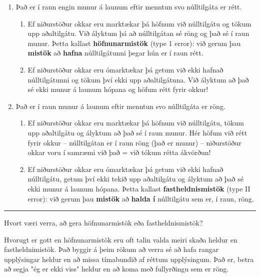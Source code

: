 \documentclass[
]{book}
\theoremstyle{definition}
\theoremstyle{definition}
\theoremstyle{definition}
\theoremstyle{definition}
\theoremstyle{remark}
\begin{document}
\begin{enumerate}
\def\labelenumi{\arabic{enumi}.}
\item
  Það er í raun engin munur á launum eftir menntun svo núlltilgáta er rétt.

  \begin{enumerate}
  \def\labelenumii{\arabic{enumii}.}
  \item
    Ef niðurstöður okkar eru marktækar þá höfnum við núlltilgátu og tökum upp aðaltilgátu. Við ályktum þá að núlltilgátan sé röng og það sé í raun munur. Þetta kallast \textbf{höfnunarmistök} (type 1 error): við gerum þau \textbf{mistök} að \textbf{hafna} núlltilgátunni þegar hún er í raun rétt.
  \item
    Ef niðurstöður okkar eru ómarktækar þá getum við ekki hafnað núlltilgátunni og tökum því ekki upp aðaltilgátuna. Við ályktum að það sé ekki munur á launum hópana og höfum rétt fyrir okkur!
  \end{enumerate}
\item
  Það er í raun munur á launum eftir menntun svo núlltilgáta er röng.

  \begin{enumerate}
  \def\labelenumii{\arabic{enumii}.}
  \item
    Ef niðurstöður okkar eru marktækar þá höfnum við núlltilgátu, tökum upp aðaltilgátu og ályktum að það sé í raun munur. Hér höfum við rétt fyrir okkur -- núlltilgátan er í raun röng (það er munur) -- niðurstöður okkar voru í samræmi við það = við tókum rétta ákvörðun!
  \item
    Ef niðurstöður okkar eru ómarktækar þá getum við ekki hafnað núlltilgátu, getum því ekki tekið upp aðaltilgátu og ályktum að það sé ekki munur á launum hópana. Þetta kallast \textbf{fastheldnismistök} (type II error): við gerum þau \textbf{mistök} að \textbf{halda í} núlltilgátu sem er, í
    raun, röng.
  \end{enumerate}
\end{enumerate}

\begin{center}\rule{0.5\linewidth}{0.5pt}\end{center}

Hvort væri verra, að gera höfnunarmistök eða fastheldnismistök?

Hvorugt er gott en höfnunarmistök eru oft talin valda meiri skaða heldur en fastheldnimistök. Það byggir á þeim rökum að verra sé að hafa rangar upplýsingar heldur en að missa tímabundið af réttum upplýsingum. Það er, betra að segja "ég er ekki viss" heldur en að koma með fullyrðingu sem er röng.
\end{document}

